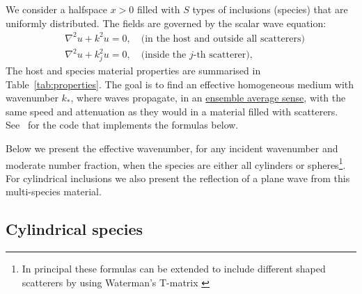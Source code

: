 \documentclass[12pt, a4paper]{article}
\begin{document}
We consider a halfspace $x>0$ filled with $S$ types of inclusions (species) that are uniformly distributed. The fields are governed by the scalar wave equation:
\begin{align}
  &\nabla^2 u + k^2 u = 0, \quad \text{(in the host and outside all scatterers)} \\
  &\nabla^2 u + k^2_j u = 0, \quad \text{(inside the $j$-th scatterer)},
\end{align}
 The host and species material properties are summarised in Table~\ref{tab:properties}.
The goal is to find an effective homogeneous medium with wavenumber $k_*$, where waves propagate, in an
\href{https://en.wikipedia.org/wiki/Ensemble_average_(statistical_mechanics)}{ensemble average sense}, with the same speed and attenuation as they would in a material filled with scatterers. See~\cite{gower_effectivewaves.jl:_2017} for the code that implements the formulas below.

Below we present the effective wavenumber, for any incident wavenumber and moderate number fraction, when the species are either all cylinders or spheres\footnote{In principal these formulas can be extended to include different shaped scatterers by using Waterman's T-matrix \cite{waterman_symmetry_1971,varadan_multiple_1978,mishchenko_t-matrix_1996}}.
  For cylindrical inclusions we also present the reflection of a plane wave from this multi-species material.





\subsection{Cylindrical species}
\end{document}
